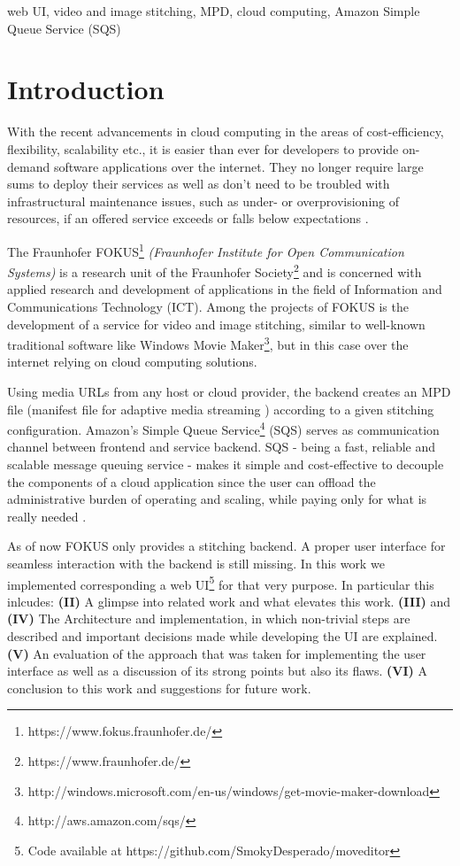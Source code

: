 \documentclass[conference]{IEEEtran}
\begin{document}
\begin{IEEEkeywords}
web UI, video and image stitching, MPD, cloud computing, Amazon Simple Queue Service (SQS)
\end{IEEEkeywords}

\section{Introduction}
With the recent advancements in cloud computing in the areas of cost-efficiency, flexibility, scalability etc., it is easier than ever for developers to provide on-demand software applications over the internet.
They no longer require large sums to deploy their services as well as don't need to be troubled with infrastructural maintenance issues, such as under- or overprovisioning of resources, if an offered service exceeds or falls below expectations \cite{Fox}.

The Fraunhofer FOKUS\footnote{https://www.fokus.fraunhofer.de/} \textit{(Fraunhofer Institute for Open Communication Systems)} is a research unit of the Fraunhofer Society\footnote{https://www.fraunhofer.de/} and is concerned with applied research and development of applications in the field of Information and Communications Technology (ICT).
Among the projects of FOKUS is the development of a service for video and image stitching, similar to well-known traditional software like Windows Movie Maker\footnote{http://windows.microsoft.com/en-us/windows/get-movie-maker-download}, but in this case over the internet relying on cloud computing solutions.

Using media URLs from any host or cloud provider, the backend creates an MPD file (manifest file for adaptive media streaming \cite{Sodagar}) according to a given stitching configuration.
Amazon's Simple Queue Service\footnote{http://aws.amazon.com/sqs/} (SQS) serves as communication channel between frontend and service backend.
SQS - being a fast, reliable and scalable message queuing service - makes it simple and cost-effective to decouple the components of a cloud application since the user can offload the administrative burden of operating and scaling, while paying only for what is really needed \cite{VS}.

As of now FOKUS only provides a stitching backend. A proper user interface for seamless interaction with the backend is still missing.
In this work we implemented corresponding a web UI\footnote{Code available at https://github.com/SmokyDesperado/moveditor} for that very purpose.
In particular this inlcudes:
\textbf{(II)} A glimpse into related work and what elevates this work.
\textbf{(III)} and \textbf{(IV)} The Architecture and implementation, in which non-trivial steps are described and important decisions made while developing the UI are explained.
\textbf{(V)} An evaluation of the approach that was taken for implementing the user interface as well as a discussion of its strong points but also its flaws.
\textbf{(VI)} A conclusion to this work and suggestions for future work.
\end{document}
